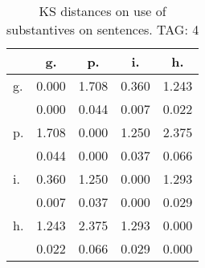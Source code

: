 \begin{table}[h!]
\begin{center}
\begin{tabular}{| l | c | c | c | c |}\hline
 & g. & p. & i. & h. \\\hline
g. & 0.000  & 1.708  & 0.360  & 1.243 \\\hline
 & 0.000  & 0.044  & 0.007  & 0.022 \\\hline
p. & 1.708  & 0.000  & 1.250  & 2.375 \\\hline
 & 0.044  & 0.000  & 0.037  & 0.066 \\\hline
i. & 0.360  & 1.250  & 0.000  & 1.293 \\\hline
 & 0.007  & 0.037  & 0.000  & 0.029 \\\hline
h. & 1.243  & 2.375  & 1.293  & 0.000 \\\hline
 & 0.022  & 0.066  & 0.029  & 0.000 \\\hline
\end{tabular}
\caption{KS distances on use of substantives on sentences. TAG: 4}
\end{center}
\end{table}